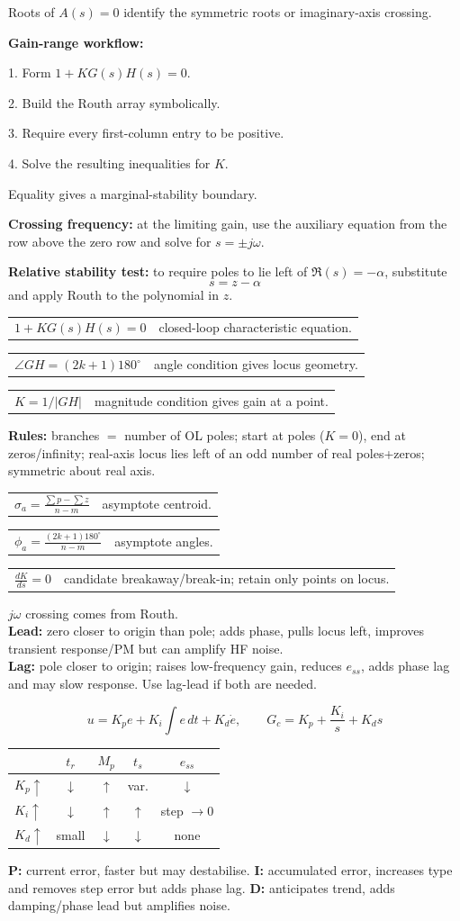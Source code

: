 \documentclass[a4paper,8pt]{extarticle}
\makeatletter
\newcommand{\topicdot}[1]{\tikz[baseline=-0.6ex]\fill[#1] (0,0) circle (0.52ex);}
\newcommand{\Cdot}{\topicdot{classicalDot}}
\newcommand{\Pdot}{\topicdot{pidDot}}
\newcommand{\mybox}[2]{
\begin{tcolorbox}[
  enhanced,
  colback=lightblue!7!white,
  colframe=lightblue!78!black,
  boxrule=0.38pt,
  boxsep=0.7pt,
  left=1.7pt,right=1.7pt,top=1.5pt,bottom=1.5pt,
  arc=0.8pt,outer arc=0.8pt,
  title={\small\textbf{#1}},
  fonttitle=\bfseries,
  coltitle=black,
  before skip=1.5pt,after skip=1.5pt,
  fontupper=\fontsize{5.55pt}{6.30pt}\selectfont\RaggedRight
]
#2
\end{tcolorbox}}
\newcommand{\frow}[2]{%
\begin{tabularx}{\linewidth}{@{}>{$\displaystyle}l<{$}@{\hspace{3pt}}X@{}}
#1 & #2
\end{tabularx}\vspace{0.3pt}}
\newcommand{\tinyhead}[1]{\textbf{#1}\;}
\makeatother
\begin{document}
\begin{multicols}{3}
{Roots of $A(s)=0$ identify the symmetric roots or imaginary-axis crossing.

\tinyhead{Gain-range workflow:}

1. Form $1+KG(s)H(s)=0$.

2. Build the Routh array symbolically.

3. Require every first-column entry to be positive.

4. Solve the resulting inequalities for $K$.

Equality gives a marginal-stability boundary.

\tinyhead{Crossing frequency:}
at the limiting gain, use the auxiliary equation from the row above the zero row and solve for $s=\pm j\omega$.

\tinyhead{Relative stability test:}
to require poles to lie left of $\Re(s)=-\alpha$, substitute
\[
s=z-\alpha
\]
and apply Routh to the polynomial in $z$.
}

\mybox{Root Locus: Recognition \& Design \Cdot}{
\frow{1+KG(s)H(s)=0}{closed-loop characteristic equation.}
\frow{\angle GH=(2k+1)180^\circ}{angle condition gives locus geometry.}
\frow{K=1/|GH|}{magnitude condition gives gain at a point.}
\tinyhead{Rules:} branches $=$ number of OL poles; start at poles ($K=0$), end at zeros/infinity; real-axis locus lies left of an odd number of real poles+zeros; symmetric about real axis.
\frow{\sigma_a=\frac{\sum p-\sum z}{n-m}}{asymptote centroid.}
\frow{\phi_a=\frac{(2k+1)180^\circ}{n-m}}{asymptote angles.}
\frow{\frac{dK}{ds}=0}{candidate breakaway/break-in; retain only points on locus.}
$j\omega$ crossing comes from Routh.\\
\tinyhead{Lead:} zero closer to origin than pole; adds phase, pulls locus left, improves transient response/PM but can amplify HF noise.\\
\tinyhead{Lag:} pole closer to origin; raises low-frequency gain, reduces $e_{ss}$, adds phase lag and may slow response. Use lag-lead if both are needed.
}

\mybox{Q2: PID Essentials \Pdot}{
\[
u=K_pe+K_i\!\int e\,dt+K_d\dot e,
\qquad G_c=K_p+\frac{K_i}{s}+K_ds
\]
\begin{tabular}{@{}lcccc@{}}
 & $t_r$ & $M_p$ & $t_s$ & $e_{ss}$\\\midrule
$K_p\uparrow$ & $\downarrow$ & $\uparrow$ & var. & $\downarrow$\\
$K_i\uparrow$ & $\downarrow$ & $\uparrow$ & $\uparrow$ & step $\to0$\\
$K_d\uparrow$ & small & $\downarrow$ & $\downarrow$ & none\\
\end{tabular}
\tinyhead{P:} current error, faster but may destabilise. \tinyhead{I:} accumulated error, increases type and removes step error but adds phase lag. \tinyhead{D:} anticipates trend, adds damping/phase lead but amplifies noise.
}


\end{multicols}
\end{document}
